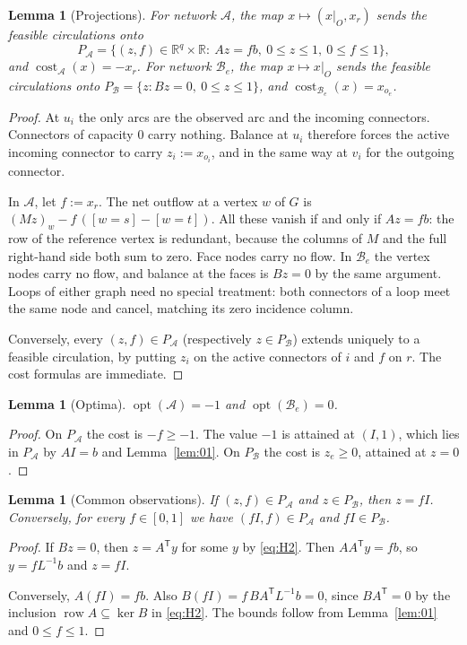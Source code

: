 \documentclass[11pt]{amsart}
\theoremstyle{plain}
\newtheorem{lemma}[theorem]{Lemma}
\theoremstyle{definition}
\theoremstyle{remark}
\newcommand{\R}{\mathbb{R}}
\newcommand{\T}{\mathsf{T}}
\newcommand{\opt}{\operatorname{opt}}
\newcommand{\cost}{\operatorname{cost}}
\newcommand{\row}{\operatorname{row}}
\begin{document}
\begin{lemma}[Projections]\label{lem:proj}
For network $\mathcal A$, the map $x\mapsto(x|_O,x_r)$ sends the feasible circulations onto
\[
P_{\mathcal A}=\{(z,f)\in\R^q\times\R:\ Az=fb,\ 0\le z\le 1,\ 0\le f\le 1\},
\]
and $\cost_{\mathcal A}(x)=-x_r$. For network $\mathcal B_e$, the map $x\mapsto x|_O$ sends the feasible
circulations onto $P_{\mathcal B}=\{z: Bz=0,\ 0\le z\le 1\}$, and $\cost_{\mathcal B_e}(x)=x_{o_e}$.
\end{lemma}
\begin{proof}
At $u_i$ the only arcs are the observed arc and the incoming connectors. Connectors of capacity $0$ carry nothing.
Balance at $u_i$ therefore forces the active incoming connector to carry $z_i:=x_{o_i}$, and in the same way at
$v_i$ for the outgoing connector.

In $\mathcal A$, let $f:=x_r$. The net outflow at a vertex $w$ of $G$ is $(Mz)_w-f\,([w=s]-[w=t])$. All these
vanish if and only if $Az=fb$: the row of the reference vertex is redundant, because the columns of $M$ and the
full right-hand side both sum to zero. Face nodes carry no flow. In $\mathcal B_e$ the vertex nodes carry no flow,
and balance at the faces is $Bz=0$ by the same argument. Loops of either graph need no special treatment: both
connectors of a loop meet the same node and cancel, matching its zero incidence column.

Conversely, every $(z,f)\in P_{\mathcal A}$ (respectively $z\in P_{\mathcal B}$) extends uniquely to a feasible
circulation, by putting $z_i$ on the active connectors of $i$ and $f$ on $r$. The cost formulas are immediate.
\end{proof}

\begin{lemma}[Optima]\label{lem:opt}
$\opt(\mathcal A)=-1$ and $\opt(\mathcal B_e)=0$.
\end{lemma}
\begin{proof}
On $P_{\mathcal A}$ the cost is $-f\ge -1$. The value $-1$ is attained at $(I,1)$, which lies in $P_{\mathcal A}$
by $AI=b$ and Lemma~\ref{lem:01}. On $P_{\mathcal B}$ the cost is $z_e\ge 0$, attained at $z=0$.
\end{proof}

\begin{lemma}[Common observations]\label{lem:common}
If $(z,f)\in P_{\mathcal A}$ and $z\in P_{\mathcal B}$, then $z=fI$. Conversely, for every $f\in[0,1]$ we have
$(fI,f)\in P_{\mathcal A}$ and $fI\in P_{\mathcal B}$.
\end{lemma}
\begin{proof}
If $Bz=0$, then $z=A^{\T}y$ for some $y$ by \eqref{eq:H2}. Then $AA^{\T}y=fb$, so $y=fL^{-1}b$ and $z=fI$.

Conversely, $A(fI)=fb$. Also $B(fI)=f\,BA^{\T}L^{-1}b=0$, since $BA^{\T}=0$ by the inclusion
$\row A\subseteq\ker B$ in \eqref{eq:H2}. The bounds follow from Lemma~\ref{lem:01} and $0\le f\le 1$.
\end{proof}
\end{document}
